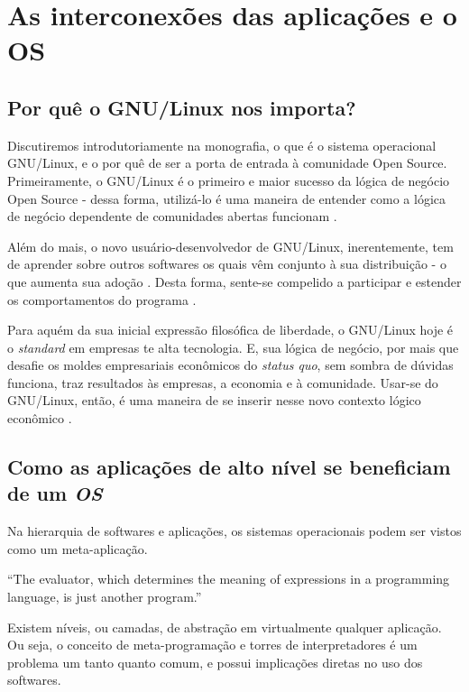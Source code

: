 \documentclass[
12pt,				%
openright,			%
oneside,			%
a4paper,			%
english,			%
french,				%
spanish,			%
brazil,				%
]{abntex2}
\begin{document}
\section{As interconexões das aplicações e o OS}

\subsection{Por quê o GNU/Linux nos importa?}
Discutiremos introdutoriamente na monografia, o que é o sistema operacional
GNU/Linux, e o por quê de ser a porta de entrada à comunidade Open
Source. Primeiramente, o GNU/Linux é o primeiro e maior sucesso da lógica
de negócio Open Source \cite{tu2000evolution,west2001open} - dessa forma,
utilizá-lo é uma maneira de entender como a lógica de negócio
dependente de comunidades abertas funcionam \cite{fink2003business}.

Além do mais, o novo usuário-desenvolvedor de GNU/Linux,
inerentemente, tem de aprender sobre outros softwares os quais vêm
conjunto à sua distribuição - o que aumenta sua adoção
\cite{west2001open}. Desta forma, sente-se compelido a participar e
estender os comportamentos do programa \cite{hertel2003motivation}.

Para aquém da sua inicial expressão filosófica de liberdade, o
GNU/Linux hoje é o \textit{standard} em empresas te alta
tecnologia. E, sua lógica de negócio, por mais que desafie os moldes
empresariais econômicos do \textit{status quo}, sem sombra de dúvidas
funciona, traz resultados às empresas, a economia e à
comunidade. Usar-se do GNU/Linux, então, é uma maneira de se inserir
nesse novo contexto lógico econômico
\cite{moody2009rebel,hippel2003open,peters2009open}.

\subsection{Como as aplicações de alto nível se beneficiam de um \textit{OS}}

Na hierarquia de softwares e aplicações, os sistemas operacionais
podem ser vistos como um meta-aplicação.

``The evaluator, which determines the meaning of expressions in a
programming language, is just another program.'' \cite{abelson1996structure}

Existem níveis, ou camadas, de abstração em virtualmente qualquer
aplicação. Ou seja, o conceito de meta-programação e torres de
interpretadores é um problema um tanto quanto comum, e possui
implicações diretas no uso dos softwares.
\end{document}
